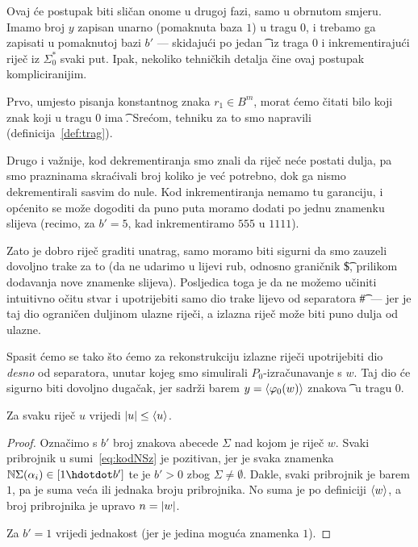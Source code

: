 Ovaj će postupak biti sličan onome u drugoj fazi, samo u obrnutom smjeru. Imamo broj $y$ zapisan unarno (pomaknuta baza $1$) u tragu $0$, i trebamo ga zapisati u pomaknutoj bazi $b'$ --- skidajući po jedan \t\textbullet\ iz traga $0$ i inkrementirajući riječ iz $\Sigma_0^*$ svaki put. Ipak, nekoliko tehničkih detalja čine ovaj postupak kompliciranijim.

Prvo, umjesto pisanja konstantnog znaka $r_1\in B^m$, morat ćemo čitati bilo koji znak koji u tragu $0$ ima \t\textbullet. Srećom, tehniku za to smo napravili (definicija~\ref{def:trag}).

Drugo i važnije, kod dekrementiranja smo znali da riječ neće postati dulja, pa smo prazninama skraćivali broj koliko je već potrebno, dok ga nismo dekrementirali sasvim do nule. Kod inkrementiranja nemamo tu garanciju, i općenito se može dogoditi da puno puta moramo dodati po jednu znamenku slijeva (recimo, za $b'=5$, kad inkrementiramo $555$ u $1111$).

Zato je dobro riječ graditi unatrag, samo moramo biti sigurni da smo zauzeli dovoljno trake za to (da ne udarimo u lijevi rub, odnosno graničnik \t\$, prilikom dodavanja nove znamenke slijeva). Posljedica toga je da ne možemo učiniti intuitivno očitu stvar i upotrijebiti samo dio trake lijevo od separatora \t\#\ ---  jer je taj dio ograničen duljinom ulazne riječi, a izlazna riječ može biti puno dulja od ulazne.

Spasit ćemo se tako što ćemo za rekonstrukciju izlazne riječi upotrijebiti dio \emph{desno} od separatora, unutar kojeg smo simulirali $P_0$-izračunavanje s $w$. Taj dio će sigurno biti dovoljno dugačak, jer sadrži barem $y=\langle\varphi_0(w)\rangle$ znakova \t\textbullet\ u tragu $0$.

\begin{lema}[{name=[duljina riječi nije veća od koda riječi]}]\label{lm:dulj<=kr}
Za svaku riječ $u$ vrijedi $\lvert u\rvert\le\langle u\rangle$.
\end{lema}
\begin{proof}
Označimo s $b'$ broj znakova abecede $\Sigma$ nad kojom je riječ $w$.
Svaki pribrojnik u sumi~\eqref{eq:kodNSz} je pozitivan, jer je svaka znamenka $\N\Sigma(\alpha_i)\in[1\dd b']$ te je $b'>0$ zbog $\Sigma\ne\emptyset$. Dakle, svaki pribrojnik je barem $1$, pa je suma veća ili jednaka broju pribrojnika. No suma je po definiciji $\langle w\rangle$, a broj pribrojnika je upravo $n=\lvert w\rvert$.

Za $b'=1$ vrijedi jednakost (jer je jedina moguća znamenka $1$).
\end{proof}

